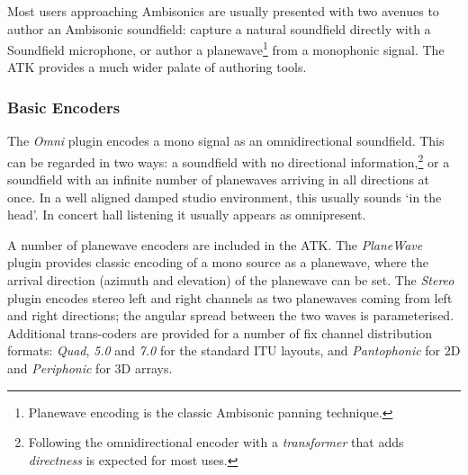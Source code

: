 \documentclass{article}
\begin{document}
Most users approaching Ambisonics are usually presented with two avenues to author an Ambisonic soundfield: capture a natural soundfield directly with a Soundfield microphone, or author a planewave\footnote{Planewave encoding is the classic Ambisonic panning technique.} from a monophonic signal.
The ATK provides a much wider palate of authoring tools.

%

\subsubsection{Basic Encoders}\label{sec:bas-encoders}
The \emph{Omni} plugin encodes a mono signal as an omnidirectional soundfield. This can be regarded in two ways:
a soundfield with no directional information,\footnote{Following the omnidirectional encoder with a \emph{transformer} that adds \emph{directness} is expected for most uses.} or a soundfield with an infinite number of plane\-waves arriving in all directions at once. In a well aligned damped studio environment, this usually sounds `in the head'. In concert hall listening it usually appears as omnipresent.

A number of planewave encoders are included in the ATK. The \emph{PlaneWave} plugin provides classic encoding of a mono source as a plane\-wave, where the arrival direction (azimuth and elevation) of the planewave can be set.
The \emph{Stereo} plugin encodes stereo left and right channels as two planewaves coming from left and right directions; the angular spread between the two waves is parameterised.
Additional trans-coders are provided for a number of fix channel distribution formats: \emph{Quad}, \emph{5.0} and \emph{7.0} for the standard ITU layouts, and \emph{Pantophonic} for 2D and \emph{Periphonic} for 3D arrays.
\end{document}
